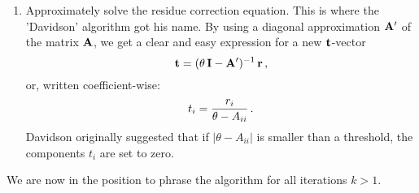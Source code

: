 \begin{enumerate}
            \item Approximately solve the residue correction equation. This is where the 'Davidson' algorithm got his name. By using a diagonal approximation $\vb{A}'$ of the matrix $\vb{A}$, we get a clear and easy expression for a new $\vb{t}$-vector
                \begin{equation}
                    \vb{t} = (\theta \thinspace \vb{I} - \vb{A}')^{-1} \thinspace \vb{r} \thinspace ,
                \end{equation}
                or, written coefficient-wise:
                \begin{equation}
                    t_i = \frac{r_i}{\theta - A_{ii}} \thinspace .
                \end{equation}
                Davidson originally suggested that if $|\theta - A_{ii}|$ is smaller than a threshold, the components $t_i$ are set to zero.
        \end{enumerate}

        We are now in the position to phrase the algorithm for all iterations $k>1$.

